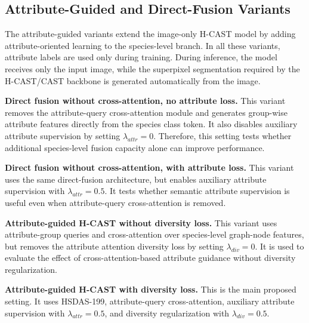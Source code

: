 \subsection{Attribute-Guided and Direct-Fusion Variants}

The attribute-guided variants extend the image-only H-CAST model by adding attribute-oriented learning to the species-level branch. In all these variants, attribute labels are used only during training. During inference, the model receives only the input image, while the superpixel segmentation required by the H-CAST/CAST backbone is generated automatically from the image.

\textbf{Direct fusion without cross-attention, no attribute loss.}
This variant removes the attribute-query cross-attention module and generates group-wise attribute features directly from the species class token. It also disables auxiliary attribute supervision by setting \(\lambda_{attr}=0\). Therefore, this setting tests whether additional species-level fusion capacity alone can improve performance.

\textbf{Direct fusion without cross-attention, with attribute loss.}
This variant uses the same direct-fusion architecture, but enables auxiliary attribute supervision with \(\lambda_{attr}=0.5\). It tests whether semantic attribute supervision is useful even when attribute-query cross-attention is removed.

\textbf{Attribute-guided H-CAST without diversity loss.}
This variant uses attribute-group queries and cross-attention over species-level graph-node features, but removes the attribute attention diversity loss by setting \(\lambda_{div}=0\). It is used to evaluate the effect of cross-attention-based attribute guidance without diversity regularization.

\textbf{Attribute-guided H-CAST with diversity loss.}
This is the main proposed setting. It uses HSDAS-199, attribute-query cross-attention, auxiliary attribute supervision with \(\lambda_{attr}=0.5\), and diversity regularization with \(\lambda_{div}=0.5\).

